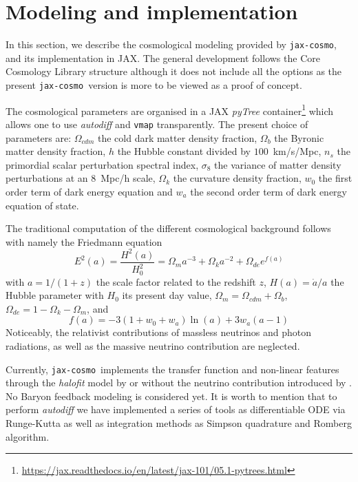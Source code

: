 \documentclass[final,5p,times,twocolumn,authoryear]{elsarticle}
\newcommand{\jaxcosmo}{\texttt{jax-cosmo}}
\begin{document}
\section{Modeling and implementation}
\label{sec-jaxcosmo-design}
In this section, we describe the cosmological modeling provided by \jaxcosmo, and its implementation in JAX. The general development follows the Core Cosmology Library structure \citep{2019ApJS..242....2C} although it does not include all the options as the present \jaxcosmo\ version is more to be viewed as a proof of concept.

The cosmological parameters are organised in a JAX \textit{pyTree} container\footnote{\url{https://jax.readthedocs.io/en/latest/jax-101/05.1-pytrees.html}} which allows one to use \textit{autodiff} and \texttt{vmap} transparently. The present choice of parameters are: $\Omega_{cdm}$ the cold dark matter density fraction, $\Omega_b$ the Byronic matter density fraction, $h$ the Hubble constant divided by $100$~km/s/Mpc, $n_s$ the primordial scalar perturbation spectral index, $\sigma_8$ the variance of matter density perturbations at an $8$~Mpc/h scale, $\Omega_k$ the curvature density fraction, $w_0$ the first order term of dark energy equation and $w_a$ the second order term of dark energy equation of state. 

The traditional computation of the different cosmological background follows \cite{2005A&A...443..819P}  with namely the Friedmann equation
\begin{equation}
    E^2(a) = \frac{H^2(a)}{H^2_0} = \Omega_m a^{-3} + \Omega_k a^{-2} + \Omega_{de} e^{f(a)}
\end{equation}
with $a=1/(1+z)$ the scale factor related to the redshift $z$, $H(a)=\dot{a}/a$ the Hubble parameter with $H_0$ its present day value, $\Omega_m= \Omega_{cdm}+\Omega_b$, $\Omega_{de}=1-\Omega_k-\Omega_m$, and 
\begin{equation}
    f(a) = -3 (1 + w_0 + w_a) \ln(a) + 3 w_a (a - 1)
\end{equation}
Noticeably, the relativist contributions of massless neutrinos and photon radiations, as well as the massive neutrino contribution are neglected.

Currently, \jaxcosmo\  implements the \cite{Eisenstein_1998} transfer function and non-linear features through the \textit{halofit} model by \cite{2012ApJ...761..152T} or \cite{2003MNRAS.341.1311S} without the neutrino contribution introduced by \cite{10.1111/j.1365-2966.2011.20222.x}. No Baryon feedback modeling is considered yet. It is worth to mention that to perform \textit{autodiff} we have implemented a series of tools as differentiable ODE via Runge-Kutta as well as integration methods as Simpson quadrature and Romberg algorithm.
\end{document}
